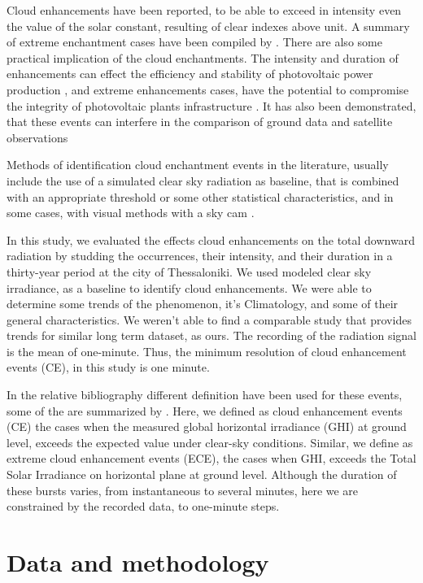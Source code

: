 \documentclass[preprint, 3p,
authoryear]{elsarticle} %
\begin{document}
Cloud enhancements have been reported, to be able to exceed in intensity
even the value of the solar constant, resulting of clear indexes above
unit. A summary of extreme enchantment cases have been compiled by
\citet{Martins2022}. There are also some practical implication of the
cloud enchantments. The intensity and duration of enhancements can
effect the efficiency and stability of photovoltaic power production
\citep{Lappalainen2020, Jaervelae2020}, and extreme enhancements cases,
have the potential to compromise the integrity of photovoltaic plants
infrastructure \citep{DoNascimento2019}. It has also been demonstrated,
that these events can interfere in the comparison of ground data and
satellite observations \citep{Damiani2018}

Methods of identification cloud enchantment events in the literature,
usually include the use of a simulated clear sky radiation as baseline,
that is combined with an appropriate threshold or some other statistical
characteristics, and in some cases, with visual methods with a sky cam
\citep[ and references therein]{Vamvakas2020, Mol2023}.

In this study, we evaluated the effects cloud enhancements on the total
downward radiation by studding the occurrences, their intensity, and
their duration in a thirty-year period at the city of Thessaloniki. We
used modeled clear sky irradiance, as a baseline to identify cloud
enhancements. We were able to determine some trends of the phenomenon,
it's Climatology, and some of their general characteristics. We weren't
able to find a comparable study that provides trends for similar long
term dataset, as ours. The recording of the radiation signal is the mean
of one-minute. Thus, the minimum resolution of cloud enhancement events
(CE), in this study is one minute.

In the relative bibliography different definition have been used for
these events, some of the are summarized by \citet{Gueymard2017}. Here,
we defined as cloud enhancement events (CE) the cases when the measured
global horizontal irradiance (GHI) at ground level, exceeds the expected
value under clear-sky conditions. Similar, we define as extreme cloud
enhancement events (ECE), the cases when GHI, exceeds the Total Solar
Irradiance on horizontal plane at ground level. Although the duration of
these bursts varies, from instantaneous to several minutes, here we are
constrained by the recorded data, to one-minute steps.

\hypertarget{data-and-methodology}{%
\section{Data and methodology}\label{data-and-methodology}}
\end{document}
